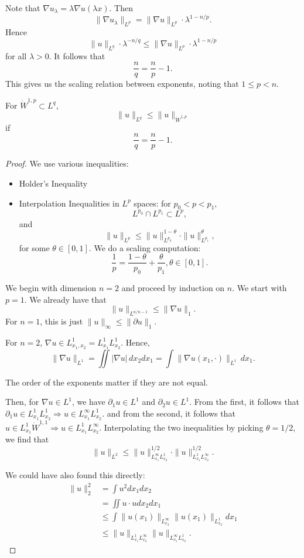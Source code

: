 \documentclass[11pt]{scrartcl}
\begin{document}
Note that $\nabla u_\lambda = \lambda \nabla u(\lambda x)$.  Then 
$$\|\nabla u_\lambda\|_{L^p} = \| \nabla u \|_{L^p} \cdot \lambda^{1 - n/p}.$$
Hence $$\|u\|_{L^q} \cdot \lambda^{-n/q} \le \|\nabla u\|_{L^p} \cdot \lambda^{1 - n/p}$$
for all $\lambda > 0$.  It follows that 
$$\frac{n}{q} = \frac{n}{p} - 1.$$
This gives us the scaling relation between exponents, noting that $1 \le p < n$.
\begin{thm}  For $\dot{W}^{1,p} \subset L^q$, 
$$\|u\|_{L^q} \le \| u \|_{\dot{W}^{1, p}}$$
if 
$$\frac{n}{q} = \frac{n}{p} - 1.$$
\end{thm}
\begin{proof}
We use various inequalities:
\begin{itemize}
\item Holder's Inequality
\item Interpolation Inequalities in $L^p$ spaces: for $p_0 < p < p_1$,
$$L^{p_0} \cap L^{p_1} \subset L^p,$$
and 
$$\|u\|_{L^p} \le \|u\|_{L^{p_0}} ^{1-\theta}\cdot \|u\|_{L^{p_1}}^\theta,$$
for some $\theta \in [0, 1]$.
We do a scaling computation:
$$\frac{1}{p} = \frac{1 - \theta}{p_0} + \frac{\theta}{p_1}, \theta \in [0, 1].$$
\end{itemize}
We begin with dimension $n = 2$ and proceed by induction on $n$.  We start with $p = 1$.  We already have that 
$$\|u\|_{L^{n/n-1}} \le \|\nabla u\|_{1}.$$
For $n = 1$, this is just $\|u\|_{\infty} \le \|\partial u\|_1$.

For $n = 2$, $\nabla u \in L_{x_1, x_2}^1 = L_{x_1}^1L_{x_2}^1$.  Hence,
$$\|\nabla u\|_{L^1} = \iint |\nabla u| \, dx_2 dx_1 = \int \|\nabla u(x_1, \cdot)\|_{L^1}\,dx_1.$$
\begin{remark}The order of the exponents matter if they are not equal.
\end{remark}
Then, for $\nabla u \in L^1$, we have $\partial_1 u \in L^1$ and $\partial_2 u \in L^1$.  
From the first, it follows that $\partial_1 u \in L_{x_1}^1 L_{x_2}^1 \Longrightarrow u \in L_{x_1}^{\infty}L_{x_2}^1$. and from the second, it follows that $u \in L_{x_1}^1 \dot{W}^{1, 1} \Longrightarrow u \in L_{x_1}^1 L_{x_2}^{\infty}$.  Interpolating the two inequalities by picking $\theta = 1/2$, we find that 
$$\|u\|_{L^2} \le \|u\|_{L_{x_1}^{\infty}L_{x_2}^1}^{1/2} \cdot \|u\|_{L_{x_1}^1 L_{x_2}^{\infty}}^{1/2}.$$

We could have also found this directly:
\begin{align*}
\|u\|_2^2 &= \int u^2 dx_1 dx_2 \\
&= \iint u \cdot u dx_2 dx_1 \\
&\le \int \|u(x_1)\|_{L_{x_2}^{\infty}} \|u(x_1)\|_{L_{x_2}^1} dx_1\\
&\le \|u\|_{L_{x_1}^1L_{x_2}^{\infty}}\|u\|_{L_{x_1}^{\infty}L_{x_2}^1}.
\end{align*}


\end{proof}
\end{document}
